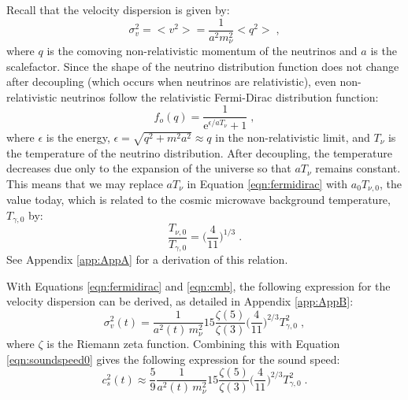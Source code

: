 \documentclass[twocolumn,superscriptaddress,prd]{revtex4}
\newcommand{\me}{\mathrm{e}}
\begin{document}
Recall that the velocity dispersion is
given by:
\begin{equation}\label{eqm:veldisp}
  \sigma_v^2 = < v^2 > = \frac{1}{a^2 m_\nu^2} < q^2> \;,
\end{equation}
where $q$ is the comoving non-relativistic momentum of the neutrinos
and $a$ is the scalefactor. 
Since the shape of the neutrino distribution function does not change
after decoupling (which occurs when neutrinos are relativistic),  even
non-relativistic neutrinos follow the relativistic Fermi-Dirac distribution function:
\begin{equation}\label{eqn:fermidirac} 
  f_o(q) = \frac{1}{\me^{\epsilon/aT_\nu} + 1 }\;,
\end{equation}
where $\epsilon$ is the energy, $\epsilon = \sqrt{ q^2 + m^2 a^2}
\approx q $ in the non-relativistic limit, and
$T_\nu$ is the temperature of the neutrino distribution.  
After decoupling, the temperature decreases due only to the expansion of the
universe so that $aT_\nu$ remains constant. 
This means that we may replace $aT_\nu$ in Equation \eqref{eqn:fermidirac}
with $a_0T_{\nu,0}$, the value today, which is related to the cosmic
microwave background temperature, $T_{\gamma,0}$ by:
\begin{equation}\label{eqn:cmb}
  \frac{T_{\nu,0}}{T_{\gamma,0}} =\bigg(\frac{4}{11}\bigg)^{1/3}\;.
\end{equation}  
See Appendix \ref{app:AppA} for a derivation of this relation.

With Equations \eqref{eqn:fermidirac} and \eqref{eqn:cmb}, the following expression for the velocity dispersion can be
derived, as detailed in Appendix \ref{app:AppB}:
\begin{equation}\label{eqn:veldisp5}
  \sigma_v^2(t) = \frac{1}{a^2(t)\,m^2_\nu} 15 \frac{ \zeta(5) }{\zeta(3) } \bigg(
  \frac{4}{11} \bigg)^{2/3} T_{\gamma,0}^2 \;,
\end{equation}
where $\zeta$ is the Riemann zeta function. 
Combining this with Equation \eqref{eqn:soundspeed0} gives the
following expression for the sound speed:
\begin{equation}\label{eqn:soundspeed1}
  c_s^2(t) \approx \frac{5}{9} \frac{1}{a^2(t)\,m^2_\nu} 15 \frac{ \zeta(5) }{\zeta(3) } \bigg(
  \frac{4}{11} \bigg)^{2/3} T_{\gamma,0}^2 \;.
\end{equation}
\end{document}
